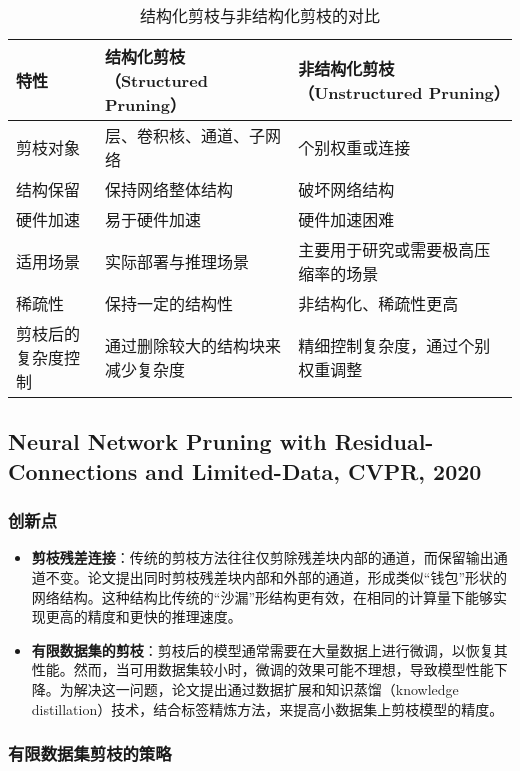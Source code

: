 \documentclass[twocolumn, 10pt]{article} %
\begin{document}
\begin{table*}[h!]
    \centering
    \begin{tabular}{|m{4cm}|m{6cm}|m{6cm}|}
        \hline
        \textbf{特性} & \textbf{结构化剪枝（Structured Pruning）} & \textbf{非结构化剪枝（Unstructured Pruning）} \\ \hline
        剪枝对象 & 层、卷积核、通道、子网络 & 个别权重或连接 \\ \hline
        结构保留 & 保持网络整体结构 & 破坏网络结构 \\ \hline
        硬件加速 & 易于硬件加速 & 硬件加速困难 \\ \hline
        适用场景 & 实际部署与推理场景 & 主要用于研究或需要极高压缩率的场景 \\ \hline
        稀疏性 & 保持一定的结构性 & 非结构化、稀疏性更高 \\ \hline
        剪枝后的复杂度控制 & 通过删除较大的结构块来减少复杂度 & 精细控制复杂度，通过个别权重调整 \\ \hline
    \end{tabular}
    \caption{结构化剪枝与非结构化剪枝的对比}
    \label{tab:pruning_comparison}
\end{table*}

\subsection{Neural Network Pruning with Residual-Connections and Limited-Data, CVPR, 2020}
\subsubsection{创新点}
\begin{itemize}[left=2em] %
    \item \textbf{剪枝残差连接}：传统的剪枝方法往往仅剪除残差块内部的通道，而保留输出通道不变。论文提出同时剪枝残差块内部和外部的通道，形成类似“钱包”形状的网络结构。这种结构比传统的“沙漏”形结构更有效，在相同的计算量下能够实现更高的精度和更快的推理速度。
    \item \textbf{有限数据集的剪枝}：剪枝后的模型通常需要在大量数据上进行微调，以恢复其性能。然而，当可用数据集较小时，微调的效果可能不理想，导致模型性能下降。为解决这一问题，论文提出通过数据扩展和知识蒸馏（knowledge distillation）技术，结合标签精炼方法，来提高小数据集上剪枝模型的精度。
\end{itemize}

\subsubsection{有限数据集剪枝的策略}
\end{document}
